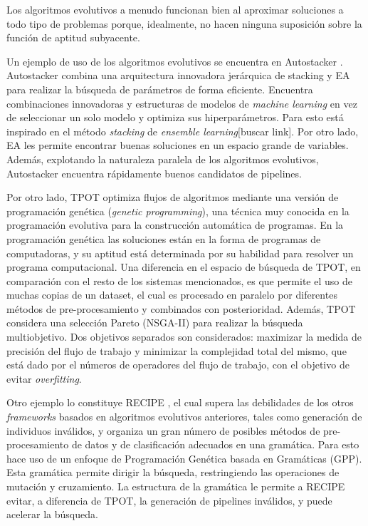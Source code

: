 Los algoritmos evolutivos a menudo funcionan bien al aproximar soluciones a todo tipo de problemas porque, idealmente, no hacen ninguna suposición sobre la función de aptitud subyacente. %

Un ejemplo de uso de los algoritmos evolutivos se encuentra en Autostacker \cite{chen2018autostacker}. Autostacker combina una arquitectura innovadora jerárquica de stacking y EA para realizar la búsqueda de parámetros de forma eficiente. Encuentra combinaciones innovadoras y estructuras de modelos de \textit{machine learning} en vez de seleccionar un solo modelo y optimiza sus hiperparámetros. Para esto está inspirado en el método \textit{stacking} de \textit{ensemble learning}[buscar link]. Por otro lado, EA les permite encontrar buenas soluciones en un espacio grande de variables. Además, explotando la naturaleza paralela de los algoritmos evolutivos, Autostacker encuentra rápidamente buenos candidatos de pipelines.

Por otro lado, TPOT \cite{olson2019tpot} optimiza flujos de algoritmos mediante una versión de programación genética (\textit{genetic programming}), una técnica muy conocida en la programación evolutiva para la construcción automática de programas. En la programación genética las soluciones están en la forma de programas de computadoras, y su aptitud está determinada por su habilidad para resolver un programa computacional. Una diferencia en el espacio de búsqueda de TPOT, en comparación con el resto de los sistemas mencionados, es que permite el uso de muchas copias de un dataset, el cual es procesado en paralelo por diferentes métodos de pre-procesamiento y combinados con posterioridad. Además, TPOT considera una selección Pareto (NSGA-II) \cite{NSGA-II} para realizar la búsqueda multiobjetivo. Dos objetivos separados son considerados: maximizar la medida de precisión del flujo de trabajo y minimizar la complejidad total del mismo, que está dado por el números de operadores del flujo de trabajo, con el objetivo de evitar \textit{overfitting}.

Otro ejemplo lo constituye RECIPE \cite{de2017recipe}, el cual supera las debilidades de los otros \textit{frameworks} basados en algoritmos evolutivos anteriores, tales como generación de individuos inválidos, y organiza un gran número de posibles métodos de pre-procesamiento de datos y de clasificación adecuados en una gramática. Para esto hace uso de un enfoque de Programación Genética basada en Gramáticas (GPP). Esta gramática permite dirigir la búsqueda, restringiendo las operaciones de mutación y cruzamiento. La estructura de la gramática le permite a RECIPE evitar, a diferencia de TPOT, la generación de pipelines inválidos, y puede acelerar la búsqueda.

